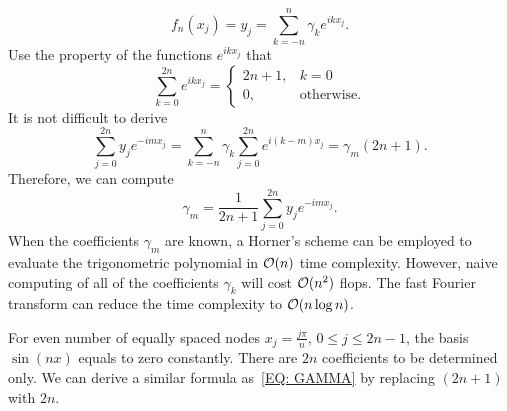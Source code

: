 \begin{equation}
    f_n(x_j) = y_j = \sum_{k=-n}^n \gamma_k e^{i k x_j}.
\end{equation}
Use the property of the functions $e^{ikx_j}$ that 
\begin{equation}
    \sum_{k=0}^{2n} e^{ik x_j} = \begin{cases}
        2n+1, & k = 0\\
        0, &\text{otherwise}.
    \end{cases}
\end{equation}
It is not difficult to derive 
\begin{equation}
    \sum_{j = 0}^{2n} y_j e^{-im x_j} = \sum_{k=-n}^{n} \gamma_k \sum_{j=0}^{2n} e^{i (k - m) x_j} = \gamma_{m} (2n+1).  
\end{equation}
Therefore, we can compute 
\begin{equation}\label{EQ: GAMMA}
    \gamma_m = \frac{1}{2n+1}  \sum_{j = 0}^{2n} y_j e^{-im x_j}.
\end{equation}
When the coefficients $\gamma_m$ are known, a Horner's scheme can be employed to evaluate the trigonometric polynomial in $\mathcal O(n)$ time complexity.  However, naive computing of all of the coefficients $\gamma_k$ will cost $\mathcal O(n^2)$ flops. The fast Fourier transform can reduce the time complexity to $\mathcal O(n\log n)$.
\begin{remark}
    For even number of equally spaced nodes $x_j = \frac{j\pi}{n}$, $0\le j\le 2n-1$, the basis $\sin( n x)$ equals to zero constantly. There are $2n$ coefficients to be determined only. We can derive a similar formula as~\eqref{EQ: GAMMA} by replacing $(2n+1)$ with $2n$.
\end{remark}

